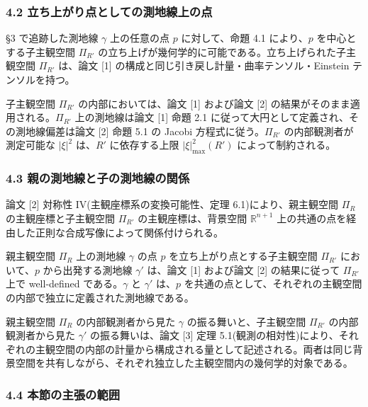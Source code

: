 \documentclass[a4paper,11pt]{ltjsarticle}
\theoremstyle{definition}
\begin{document}
\subsubsection{4.2 立ち上がり点としての測地線上の点}\label{ux7acbux3061ux4e0aux304cux308aux70b9ux3068ux3057ux3066ux306eux6e2cux5730ux7ddaux4e0aux306eux70b9}

§3 で追跡した測地線 \(\gamma\) 上の任意の点 \(p\) に対して、命題 4.1 により、\(p\) を中心とする子主観空間 \(\Pi_{R'}\) の立ち上げが幾何学的に可能である。立ち上げられた子主観空間 \(\Pi_{R'}\) は、論文 {[}1{]} の構成と同じ引き戻し計量・曲率テンソル・Einstein テンソルを持つ。

子主観空間 \(\Pi_{R'}\) の内部においては、論文 {[}1{]} および論文 {[}2{]} の結果がそのまま適用される。\(\Pi_{R'}\) 上の測地線は論文 {[}1{]} 命題 2.1 に従って大円として定義され、その測地線偏差は論文 {[}2{]} 命題 5.1 の Jacobi 方程式に従う。\(\Pi_{R'}\) の内部観測者が測定可能な \(|\xi|^2\) は、\(R'\) に依存する上限 \(|\xi|^2_{\max}(R')\) によって制約される。

\subsubsection{4.3 親の測地線と子の測地線の関係}\label{ux89aaux306eux6e2cux5730ux7ddaux3068ux5b50ux306eux6e2cux5730ux7ddaux306eux95a2ux4fc2}

論文 {[}2{]} 対称性 IV(主観座標系の変換可能性、定理 6.1)により、親主観空間 \(\Pi_R\) の主観座標と子主観空間 \(\Pi_{R'}\) の主観座標は、背景空間 \(\mathbb{R}^{n+1}\) 上の共通の点を経由した正則な合成写像によって関係付けられる。

親主観空間 \(\Pi_R\) 上の測地線 \(\gamma\) の点 \(p\) を立ち上がり点とする子主観空間 \(\Pi_{R'}\) において、\(p\) から出発する測地線 \(\gamma'\) は、論文 {[}1{]} および論文 {[}2{]} の結果に従って \(\Pi_{R'}\) 上で well-defined である。\(\gamma\) と \(\gamma'\) は、\(p\) を共通の点として、それぞれの主観空間の内部で独立に定義された測地線である。

親主観空間 \(\Pi_R\) の内部観測者から見た \(\gamma\) の振る舞いと、子主観空間 \(\Pi_{R'}\) の内部観測者から見た \(\gamma'\) の振る舞いは、論文 {[}3{]} 定理 5.1(観測の相対性)により、それぞれの主観空間の内部の計量から構成される量として記述される。両者は同じ背景空間を共有しながら、それぞれ独立した主観空間内の幾何学的対象である。

\subsubsection{4.4 本節の主張の範囲}\label{ux672cux7bc0ux306eux4e3bux5f35ux306eux7bc4ux56f2}
\end{document}
